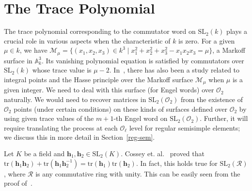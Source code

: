 \documentclass[10pt,twoside]{amsart}
\newcommand{\SL}{\mathrm{SL}}
\newcommand{\tr}{\mathrm{tr}}
\newcommand{\R}{\mathcal{O}_2}
\theoremstyle{definition}
\theoremstyle{definition}
\begin{document}

\section{The Trace Polynomial}{\label{tr}}

The trace polynomial corresponding to the commutator word on $\SL_2(k)$ plays a crucial role in various aspects when the characteristic of $k$ is zero. For a given $\mu\in k$, we have $\mathcal{M}_{\mu} = \{(x_1, x_2, x_3) \in k^3 \mid x_1^2 + x_2^2 + x_3^2-x_1x_2x_3 = \mu \}$, a Markoff surface in $\mathbb{A}_k^3$. Its vanishing polynomial equation is satisfied by commutators over $\SL_2(k)$ whose trace value is $\mu - 2$. In~\cite{AmitPeter2022}, there has also been a study related to integral points and the Hasse principle over the Markoff surface $\mathcal{M}_{\mu}$ when $\mu$ is a given integer. We need to deal with this surface (for Engel words) over $\R$ naturally. We would need to recover matrices in $\SL_2(\R)$ from the existence of $\R$ points (under certain conditions) on these kinds of surfaces defined over $\R$ by using given trace values of the $m+1$-th Engel word on $\SL_2(\R)$. Further, it will require translating the process at each $\mathcal{O}_{\ell}$ level for regular semisimple elements; we discuss this in more detail in Section~\ref{reg-sem}.

Let $K$ be a field and $\textbf{h}_1, \textbf{h}_2\in \SL_2(K)$. Cossey et. al.~\cite{CosseyMacdonaldStreet} proved that $\tr(\textbf{h}_1 \textbf{h}_2) + \tr(\textbf{h}_1 \textbf{h}_2^{-1}) = \tr(\textbf{h}_1) \tr(\textbf{h}_2)$. In fact, this holds true for $\SL_2(\mathcal{R})$, where $\mathcal{R}$ is any commutative ring with unity. This can be easily seen from the proof of~\cite[Lemma 5.2.1]{CosseyMacdonaldStreet}. 
\end{document}
